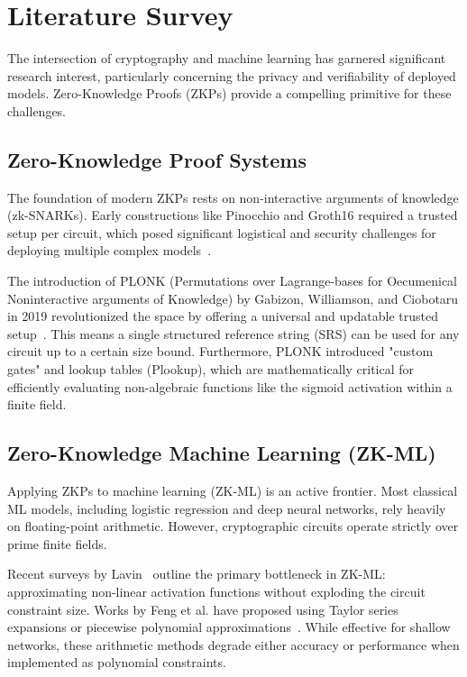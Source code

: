 \chapter{Literature Survey}

The intersection of cryptography and machine learning has garnered significant research interest, particularly concerning the privacy and verifiability of deployed models. Zero-Knowledge Proofs (ZKPs) provide a compelling primitive for these challenges.

\section{Zero-Knowledge Proof Systems}
The foundation of modern ZKPs rests on non-interactive arguments of knowledge (zk-SNARKs). Early constructions like Pinocchio and Groth16 required a trusted setup per circuit, which posed significant logistical and security challenges for deploying multiple complex models~\cite{gennaro2013quadratic}. 

The introduction of PLONK (Permutations over Lagrange-bases for Oecumenical Noninteractive arguments of Knowledge) by Gabizon, Williamson, and Ciobotaru in 2019 revolutionized the space by offering a universal and updatable trusted setup~\cite{kates2020plonk}. This means a single structured reference string (SRS) can be used for any circuit up to a certain size bound. Furthermore, PLONK introduced "custom gates" and lookup tables (Plookup), which are mathematically critical for efficiently evaluating non-algebraic functions like the sigmoid activation within a finite field.

\section{Zero-Knowledge Machine Learning (ZK-ML)}
Applying ZKPs to machine learning (ZK-ML) is an active frontier. Most classical ML models, including logistic regression and deep neural networks, rely heavily on floating-point arithmetic. However, cryptographic circuits operate strictly over prime finite fields.

Recent surveys by Lavin~\cite{lavin2024surveyapplicationszeroknowledgeproofs} outline the primary bottleneck in ZK-ML: approximating non-linear activation functions without exploding the circuit constraint size. Works by Feng et al. have proposed using Taylor series expansions or piecewise polynomial approximations~\cite{cryptoeprint:2023/1345}. While effective for shallow networks, these arithmetic methods degrade either accuracy or performance when implemented as polynomial constraints.

